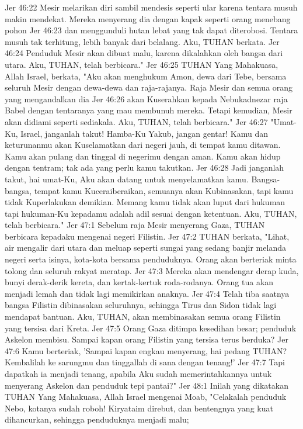 Jer 46:22  Mesir melarikan diri sambil mendesis seperti ular karena tentara musuh makin mendekat. Mereka menyerang dia dengan kapak seperti orang menebang pohon
Jer 46:23  dan menggunduli hutan lebat yang tak dapat diterobosi. Tentara musuh tak terhitung, lebih banyak dari belalang. Aku, TUHAN berkata.
Jer 46:24  Penduduk Mesir akan dibuat malu, karena dikalahkan oleh bangsa dari utara. Aku, TUHAN, telah berbicara."
Jer 46:25  TUHAN Yang Mahakuasa, Allah Israel, berkata, "Aku akan menghukum Amon, dewa dari Tebe, bersama seluruh Mesir dengan dewa-dewa dan raja-rajanya. Raja Mesir dan semua orang yang mengandalkan dia
Jer 46:26  akan Kuserahkan kepada Nebukadnezar raja Babel dengan tentaranya yang mau membunuh mereka. Tetapi kemudian, Mesir akan didiami seperti sediakala. Aku, TUHAN, telah berbicara."
Jer 46:27  "Umat-Ku, Israel, janganlah takut! Hamba-Ku Yakub, jangan gentar! Kamu dan keturunanmu akan Kuselamatkan dari negeri jauh, di tempat kamu ditawan. Kamu akan pulang dan tinggal di negerimu dengan aman. Kamu akan hidup dengan tentram; tak ada yang perlu kamu takutkan.
Jer 46:28  Jadi janganlah takut, hai umat-Ku, Aku akan datang untuk menyelamatkan kamu. Bangsa-bangsa, tempat kamu Kuceraiberaikan, semuanya akan Kubinasakan, tapi kamu tidak Kuperlakukan demikian. Memang kamu tidak akan luput dari hukuman tapi hukuman-Ku kepadamu adalah adil sesuai dengan ketentuan. Aku, TUHAN, telah berbicara."
Jer 47:1  Sebelum raja Mesir menyerang Gaza, TUHAN berbicara kepadaku mengenai negeri Filistin.
Jer 47:2  TUHAN berkata, "Lihat, air mengalir dari utara dan meluap seperti sungai yang sedang banjir melanda negeri serta isinya, kota-kota bersama penduduknya. Orang akan berteriak minta tolong dan seluruh rakyat meratap.
Jer 47:3  Mereka akan mendengar derap kuda, bunyi derak-derik kereta, dan kertak-kertuk roda-rodanya. Orang tua akan menjadi lemah dan tidak lagi memikirkan anaknya.
Jer 47:4  Telah tiba saatnya bangsa Filistin dibinasakan seluruhnya, sehingga Tirus dan Sidon tidak lagi mendapat bantuan. Aku, TUHAN, akan membinasakan semua orang Filistin yang tersisa dari Kreta.
Jer 47:5  Orang Gaza ditimpa kesedihan besar; penduduk Askelon membisu. Sampai kapan orang Filistin yang tersisa terus berduka?
Jer 47:6  Kamu berteriak, 'Sampai kapan engkau menyerang, hai pedang TUHAN? Kembalilah ke sarungmu dan tinggallah di sana dengan tenang!'
Jer 47:7  Tapi dapatkah ia menjadi tenang, apabila Aku sudah memerintahkannya untuk menyerang Askelon dan penduduk tepi pantai?"
Jer 48:1  Inilah yang dikatakan TUHAN Yang Mahakuasa, Allah Israel mengenai Moab, "Celakalah penduduk Nebo, kotanya sudah roboh! Kiryataim direbut, dan bentengnya yang kuat dihancurkan, sehingga penduduknya menjadi malu;

